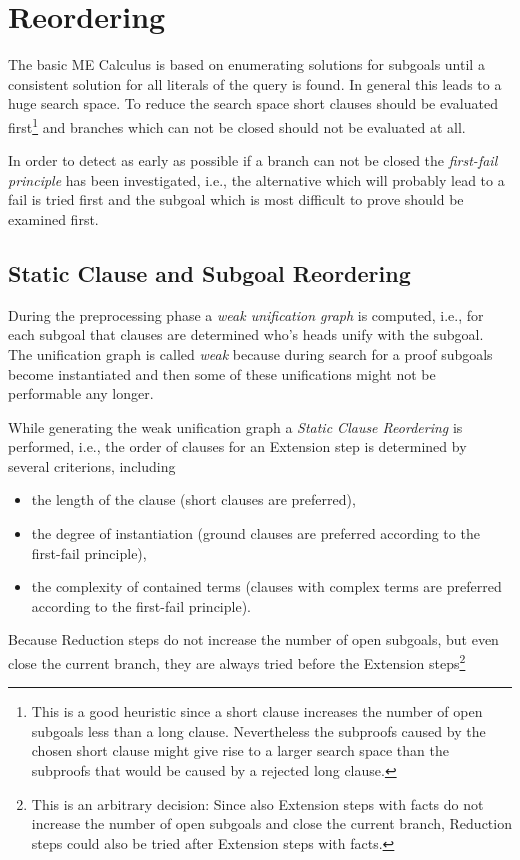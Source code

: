 \section{Reordering}

The basic ME Calculus is based on enumerating solutions for subgoals
until a consistent solution for all literals of the query is found. In
general this leads to a huge search space. To reduce the search space
short clauses should be evaluated first\footnote{This is a good
	heuristic since a short clause increases the number of open
	subgoals less than a long clause. Nevertheless the subproofs
	caused by the chosen short clause might give rise to a larger
	search space than the subproofs that would be caused by a
	rejected long clause.} 
and branches which can not be closed should not be evaluated at all.
 
In order to detect as early as possible if a branch can not be closed
the {\em first-fail principle\/} has been investigated, i.e., the
alternative which will probably lead to a fail is tried first and the
subgoal which is most difficult to prove should be examined first.


\subsection{Static Clause and Subgoal Reordering}

During the preprocessing phase a {\em weak unification graph\/} is
computed, i.e., for each subgoal that clauses are determined who's
heads unify with the subgoal. The unification graph is called {\em
weak\/} because during search for a proof subgoals become
instantiated and then some of these unifications might not be
performable any longer.

While generating the weak unification graph a {\em Static Clause
Reordering\/} is performed, i.e., the order of clauses for an
Extension step is determined by several criterions, including 
\begin{itemize}
\item the length of the clause (short clauses are preferred),
\item the degree of instantiation (ground clauses are preferred
	according to the first-fail principle),
\item the complexity of contained terms (clauses with complex
      terms are preferred according to the first-fail principle).  
\end{itemize}
Because Reduction steps do not increase the number of open subgoals,
but even close the current branch, they are always tried before the
Extension steps\footnote{This is an arbitrary decision: Since also
Extension steps with facts do not increase the number of open subgoals
and close the current branch, Reduction steps could also be tried
after Extension steps with facts.}

